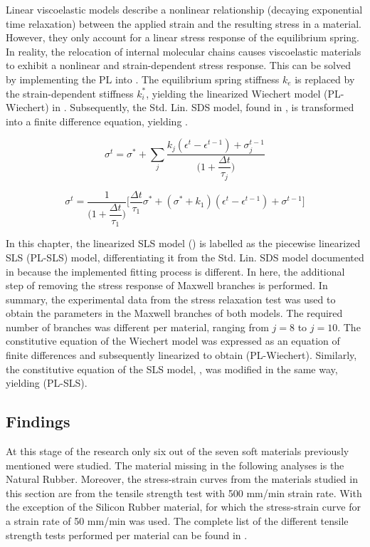Linear viscoelastic models describe a nonlinear relationship (decaying exponential time relaxation) between the applied strain and the resulting stress in a material. However, they only account for a linear stress response of the equilibrium spring. In reality, the relocation of internal molecular chains causes viscoelastic materials to exhibit a nonlinear and strain-dependent stress response. This can be solved by implementing the PL into . The equilibrium spring stiffness $k_e$ is replaced by the strain-dependent stiffness $k_i^*$, yielding the linearized Wiechert model (PL-Wiechert) in . Subsequently, the Std. Lin. SDS model, found in \cite{austin2015control}, is transformed into a finite difference equation, yielding .

\begin{equation}
\label{eq6}
\sigma^t = \sigma^* + \sum_j \frac{k_j (\epsilon^t-\epsilon^{t-1}) + \sigma_j^{t-1}}{\bigg(1 + \dfrac{\Delta t}{\tau_j}\bigg)}
\end{equation}

\begin{equation}
\label{eq7}
\sigma^ t = \frac{1}{\bigg(1+\dfrac{\Delta t} {\tau_1} \bigg)} \Bigg[ \frac{\Delta t}{\tau_1} \sigma^* + (\sigma^* + k_1) (\epsilon^t-\epsilon^{t-1}) + \sigma^{t-1} \Bigg] 
\end{equation}

In this chapter, the linearized SLS model () is labelled as the piecewise linearized SLS (PL-SLS) model, differentiating it from the Std. Lin. SDS model documented in \cite{austin2015control} because the implemented fitting process is different. In here, the additional step of removing the stress response of Maxwell branches is performed. In summary, the experimental data from the stress relaxation test was used to obtain the parameters in the Maxwell branches of both models. The required number of branches was different per material, ranging from $j=8$ to $j=10$.  The constitutive equation of the Wiechert model was expressed as an equation of finite differences and subsequently linearized to obtain  (PL-Wiechert). Similarly, the constitutive equation of the SLS model, , was modified in the same way, yielding  (PL-SLS).

\subsection{Findings}

At this stage of the research only six out of the seven soft materials previously mentioned were studied. The material missing in the following analyses is the Natural Rubber. Moreover, the stress-strain curves from the materials studied in this section are from the tensile strength test with 500 mm/min strain rate. With the exception of the Silicon Rubber material, for which the stress-strain curve for a strain rate of 50 mm/min was used. The complete list of the different tensile strength tests performed per material can be found in .

